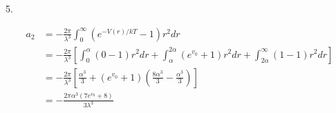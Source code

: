\documentclass[a4paper,12pt]{article}
\begin{document}
5.
\begin{minipage}[t]{0.9\textwidth}
  \begin{align*}
    a_2 &= -\frac{2 \pi}{\lambda^3} \int_0^\infty(e^{-V(r) / kT} - 1)r^2dr\\
        &= -\frac{2 \pi}{\lambda^3} \left[\int_0^\alpha(0 - 1)r^2dr + \int_\alpha^{2\alpha}(e^{v_0} + 1)r^2dr + \int_{2\alpha}^\infty(1 - 1)r^2dr\right]\\
        &= -\frac{2 \pi}{\lambda^3} \left[\frac{\alpha^3}{3} + (e^{v_0} + 1)\left(\frac{8 \alpha^3}{3} - \frac{\alpha^3}{3}\right)\right]\\
        &= -\frac{2 \pi \alpha^3 (7e^{v_0} + 8 )}{3\lambda^3}
  \end{align*}
\end{minipage}
\end{document}
